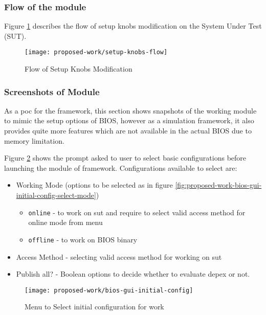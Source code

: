 \subsubsection{Flow of the module}
Figure \ref{fig:setup-knobs-flow} describes the flow of setup knobs modification on the System Under Test (SUT).

\begin{figure}[!htbp]
	\centering
	\texttt{[image: proposed-work/setup-knobs-flow]}
	\caption{Flow of Setup Knobs Modification}\label{fig:setup-knobs-flow}
\end{figure}


\subsubsection{Screenshots of Module}
As a \gls{poc} for the framework, this section shows snapshots of the working module to mimic the setup options of BIOS, however as a simulation framework, it also provides quite more features which are not available in the actual BIOS due to memory limitation.

Figure \ref{fig:proposed-work-bios-gui-initial-config} shows the prompt asked to user to select basic configurations before launching the module of framework. Configurations available to select are:

\begin{itemize}
	\item Working Mode (options to be selected as in figure \ref{fig:proposed-work-bios-gui-initial-config-select-mode})
	\begin{itemize}
		\item \verb|online| - to work on \gls{sut} and require to select valid access method for online mode from menu
		\item \verb|offline| - to work on BIOS binary
	\end{itemize}
	\item Access Method - selecting valid access method for working on \gls{sut}
	\item Publish all? - Boolean options to decide whether to evaluate \gls{depex} or not.
\end{itemize}

\begin{figure}[!htbp]
	\centering
	\texttt{[image: proposed-work/bios-gui-initial-config]}
	\caption{Menu to Select initial configuration for work}\label{fig:proposed-work-bios-gui-initial-config}
\end{figure}

